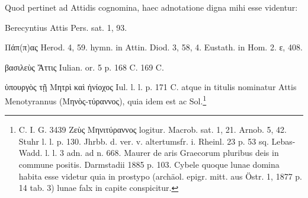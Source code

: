 \documentclass[a4paper, 11pt, oneside, polutonikogreek, german]{article}
\begin{document}
Quod pertinet ad Attidis cognomina, haec adnotatione digna mihi esse videntur:

Berecyntius Attis Pers. sat. 1, 93.

Πάπ(π)ας Herod. 4, 59. hymn. in Attin. Diod. 3, 58, 4. Eustath. in Hom. 2. ε, 408.

βασιλεὺς Ἄττις Iulian. or. 5 p. 168 C. 169 C.

ὑπουργὸς τῇ Μητρὶ καὶ ἡνίοχος Iul. l. l. p. 171 C. atque in titulis nominatur Attis Menotyrannus (Μηνὸς-τύραννος), quia idem est ac Sol.\footnote{C. I. G. 3439 Ζεὺς Μηνιτύραννος logitur. Macrob. sat. 1, 21. Arnob. 5, 42. Stuhr l. l. p. 130. Jhrbb. d. ver. v. altertumsfr. i. Rheinl. 23 p. 53 sq. Lebas-Wadd. l. l. 3 adn. ad n. 668. Maurer de aris Graecorum pluribus deis in commune positis. Darmstadii 1885 p. 103. Cybele quoque lunae domina habita esse videtur quia in prostypo (archäol. epigr. mitt. aus Östr. 1, 1877 p. 14 tab. 3) lunae falx in capite conspicitur.}
\end{document}
